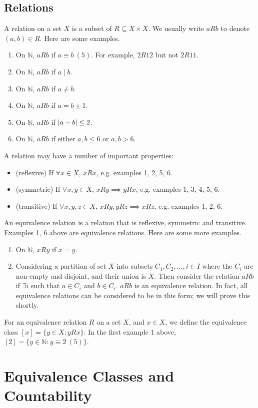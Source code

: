 \documentclass{article}
\begin{document}
	\subsection{Relations}
	A relation on a set $X$ is a subset of $R \subseteq X \times X$. We usually write $aRb$ to denote $(a, b) \in R$. Here are some examples.
	\begin{enumerate}
		\item On $\mathbb N$, $aRb$ if $a \equiv b\ (5)$. For example, $2R12$ but not $2R11$.
		\item On $\mathbb N$, $aRb$ if $a \mid b$.
		\item On $\mathbb N$, $aRb$ if $a \neq b$.
		\item On $\mathbb N$, $aRb$ if $a=b \pm 1$.
		\item On $\mathbb N$, $aRb$ if $\abs{a-b} \leq 2$.
		\item On $\mathbb N$, $aRb$ if either $a, b \leq 6$ or $a, b > 6$.
	\end{enumerate}
	A relation may have a number of important properties:
	\begin{itemize}
		\item (reflexive) If $\forall x \in X$, $xRx$, e.g. examples 1, 2, 5, 6.
		\item (symmetric) If $\forall x, y \in X$, $xRy \implies yRx$, e.g. examples 1, 3, 4, 5, 6.
		\item (transitive) If $\forall x, y, z \in X$, $xRy, yRz \implies xRz$, e.g. examples 1, 2, 6.
	\end{itemize}
	An equivalence relation is a relation that is reflexive, symmetric and transitive. Examples 1, 6 above are equivalence relations. Here are some more examples.
	\begin{enumerate}
		\item On $\mathbb N$, $xRy$ if $x=y$.
		\item Considering a partition of set $X$ into subsets $C_1, C_2, \dots, i \in I$ where the $C_i$ are non-empty and disjoint, and their union is $X$. Then consider the relation $aRb$ if $\exists i$ such that $a \in C_i$ and $b \in C_i$. $aRb$ is an equivalence relation. In fact, all equivalence relations can be considered to be in this form; we will prove this shortly.
	\end{enumerate}
	For an equivalence relation $R$ on a set $X$, and $x \in X$, we define the equivalence class $[x] = \{ y \in X: y R x \}$. In the first example 1 above, $[2] = \{ y \in \mathbb N : y \equiv 2\ (5) \}$.

	\section{Equivalence Classes and Countability}
\end{document}
